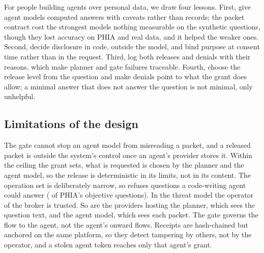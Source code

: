 For people building agents over personal data, we draw four lessons. First, give agent models computed answers
with caveats rather than records; the packet contract cost the strongest models nothing measurable on the synthetic
questions, though they lost accuracy on PHIA and real data, and it helped the weaker ones. Second, decide disclosure in code, outside the model, and bind purpose at consent time rather
than in the request. Third, log both releases and denials with their reasons, which make planner and gate failures
traceable. Fourth, choose the release level from the question and make denials point to what the grant
does allow; a minimal answer that does not answer the question is not minimal, only unhelpful.

\subsection{Limitations of the design}

The gate cannot stop an agent model from misreading a packet, and a released packet is outside the system's
control once an agent's provider stores it. Within the ceiling the grant sets, what is requested is chosen by the
planner and the agent model, so the release is deterministic in its limits, not in its content. The operation set is
deliberately narrow, so \sys{} refuses questions a code-writing agent could answer (\phiaUnsupported{} of PHIA's
\phiaTotal{} objective questions). In the threat model the operator of the broker is trusted. So are the providers
hosting the planner, which sees the question text, and the agent model, which sees each packet. The gate governs the
flow to the agent, not the agent's onward flows.
Receipts are hash-chained but anchored on the same platform, so they detect tampering by others, not by the
operator, and a stolen agent token reaches only that agent's grant.
